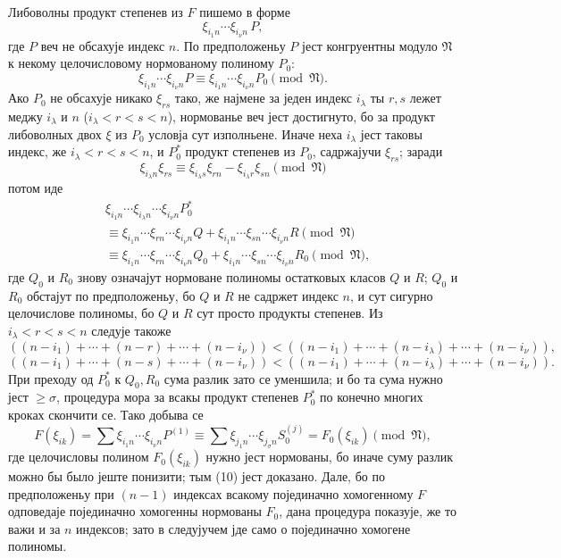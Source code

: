 ﻿\documentclass[11pt]{article}
\providecommand{\frN}{\mathfrak N}
\begin{document}
Либоволны продукт степенев из \(F\) пишемо в форме
\[
        \xi_{i_1n}\cdots\xi_{i_\nu n}\,P,
\]
где \(P\) веч не обсахује индекс \(n\). По предположеньу \(P\) јест конгруентны модуло \(\frN\) к некому целочисловому нормованому полиному \(P_0\):
\[
        \xi_{i_1n}\cdots\xi_{i_\nu n}P
        \equiv
        \xi_{i_1n}\cdots\xi_{i_\nu n}P_0
        \pmod{\frN}.
\]
Ако \(P_0\) не обсахује никако \(\xi_{rs}\) тако, же најмене за једен индекс \(i_\lambda\) ты \(r,s\) лежет меджу \(i_\lambda\) и \(n\) (\(i_\lambda<r<s<n\)), нормованье веч јест достигнуто, бо за продукт либоволных двох \(\xi\) из \(P_0\) условја сут изполньене. Иначе неха \(i_\lambda\) јест таковы индекс, же \(i_\lambda<r<s<n\), и \(P_0^*\) продукт степенев из \(P_0\), садржајучи \(\xi_{rs}\); заради
\[
        \xi_{i_\lambda n}\xi_{rs}\equiv
        \xi_{i_\lambda s}\xi_{rn}-\xi_{i_\lambda r}\xi_{sn}
        \pmod{\frN}
\]
потом иде
\begin{align*}
 &\xi_{i_1n}\cdots\xi_{i_\lambda n}\cdots\xi_{i_\nu n}P_0^*\\
 &\equiv
 \xi_{i_1n}\cdots\xi_{rn}\cdots\xi_{i_\nu n}Q
 +
 \xi_{i_1n}\cdots\xi_{sn}\cdots\xi_{i_\nu n}R
 \pmod{\frN}\\
 &\equiv
 \xi_{i_1n}\cdots\xi_{rn}\cdots\xi_{i_\nu n}Q_0
 +
 \xi_{i_1n}\cdots\xi_{sn}\cdots\xi_{i_\nu n}R_0
 \pmod{\frN},
\end{align*}
где \(Q_0\) и \(R_0\) знову означајут нормоване полиномы остатковых класов \(Q\) и \(R\); \(Q_0\) и \(R_0\) обстајут по предположеньу, бо \(Q\) и \(R\) не садржет индекс \(n\), и сут сигурно целочислове полиномы, бо \(Q\) и \(R\) сут просто продукты степенев. Из \(i_\lambda<r<s<n\) следује такоже
\[
 ((n-i_1)+\cdots+(n-r)+\cdots+(n-i_\nu))
 <
 ((n-i_1)+\cdots+(n-i_\lambda)+\cdots+(n-i_\nu)),
\]
\[
 ((n-i_1)+\cdots+(n-s)+\cdots+(n-i_\nu))
 <
 ((n-i_1)+\cdots+(n-i_\lambda)+\cdots+(n-i_\nu)).
\]
При преходу од \(P_0^*\) к \(Q_0,R_0\) сума разлик зато се уменшила; и бо та сума нужно јест \(\ge \sigma\), процедура мора за всакы продукт степенев \(P_0^*\) по конечно многих кроках скончити се. Тако добыва се
\[
        F(\xi_{ik})
        =
        \sum \xi_{i_1n}\cdots\xi_{i_\nu n}P^{(1)}
        \equiv
        \sum \xi_{j_1n}\cdots\xi_{j_\sigma n}S_0^{(j)}
        =
        F_0(\xi_{ik})\pmod{\frN},
\]
где целочисловы полином \(F_0(\xi_{ik})\) нужно јест нормованы, бо иначе суму разлик можно бы было јеште понизити; тым (10) јест доказано. Дале, бо по предположеньу при \((n-1)\) индексах всакому појединачно хомогенному \(F\) одповедаје појединачно хомогенны нормованы \(F_0\), дана процедура показује, же то важи и за \(n\) индексов; зато в следујучем јде само о појединачно хомогене полиномы.
\end{document}
